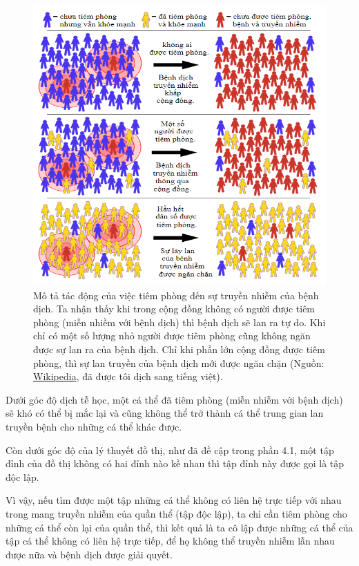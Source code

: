 \documentclass[14pt, oneside, a4paper, openany]{scrartcl}
\begin{document}
\begin{figure}[!h]
	\centering
	\includegraphics[scale=0.8]{figures/Herd_immunity_vn_2.png} 
	\caption[Mô tả tác động của việc tiêm phòng đến sự truyền nhiễm của bệnh dịch]{Mô tả tác động của việc tiêm phòng đến sự truyền nhiễm của bệnh dịch. Ta nhận thấy khi trong cộng đồng không có người được tiêm phòng (miễn nhiềm với bệnh dịch) thì bệnh dịch sẽ lan ra tự do. Khi chỉ có một số lượng nhỏ người được tiêm phòng cũng không ngăn được sự lan ra của bệnh dịch. Chỉ khi phần lớn cộng đồng được tiêm phòng, thì sự lan truyền của bệnh dịch mới được ngăn chặn (Nguồn: \href{https://en.wikipedia.org/wiki/Herd\_immunity}{Wikipedia}, đã được tôi dịch sang tiếng việt).}
	\label{fig:epidemiology}
\end{figure}

Dưới góc độ dịch tễ học, một cá thể đã tiêm phòng (miễn nhiễm với bệnh dịch) sẽ khó có thể bị mắc lại và cũng không thể trở thành cá thể trung gian lan truyền bệnh cho những cá thể khác được. 

Còn dưới góc độ của lý thuyết đồ thị, như đã đề cập trong phần 4.1, một tập đỉnh của đồ thị không có hai đỉnh nào kề nhau thì tập đỉnh này được gọi là tập độc lập. 

Vì vậy, nếu tìm được một tập những cá thể không có liên hệ trực tiếp với nhau trong mang truyền nhiễm của quần thể (tập độc lập), ta chỉ cần tiêm phòng cho những cá thể còn lại của quần thể, thì kết quả là ta cô lập được những cá thể của tập cá thể không có liên hệ trực tiếp, để họ không thể truyền nhiễm lẫn nhau được nữa và bệnh dịch được giải quyết.
\end{document}
